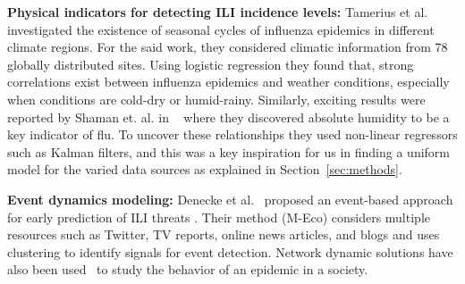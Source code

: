 \textbf{Physical indicators for detecting ILI incidence levels:} 
Tamerius et al.~\cite{ref9} investigated the existence of seasonal 
cycles of influenza epidemics in different climate regions. For the said
work, they considered climatic information from 78 globally distributed sites. 
Using logistic regression  they found that, strong correlations exist between 
influenza epidemics and weather conditions, especially when conditions
are cold-dry or humid-rainy. Similarly, exciting results were reported
by Shaman et. al. in ~\cite{Shaman_orig_humidity_link, Shaman_humidity_USA}
where they discovered absolute humidity to be a key indicator of flu. To uncover 
these relationships they used non-linear regressors such as Kalman filters,
and this was a key inspiration for us in finding a uniform model for the
varied data sources as explained in Section~\ref{sec:methods}.

%
\textbf{Event dynamics modeling:}
Denecke et al.~\cite{ref3}
proposed an event-based approach for early prediction
of ILI threats \cite{ref3}. Their method (M-Eco) considers
multiple resources such as Twitter, TV reports, online news articles,
and blogs and uses clustering to identify signals for event detection.
Network dynamic solutions have also been used~\cite{ref11} 
to study the behavior of an epidemic in a society. 
 
